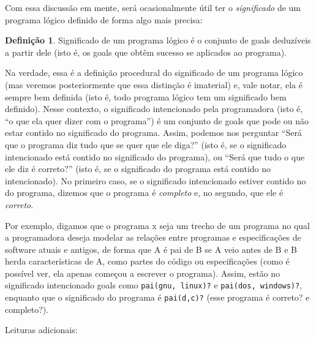 \documentclass{article}
\theoremstyle{definition}
\newtheorem{definition}{Definição}[section]
\theoremstyle{remark}
\begin{document}
Com essa discussão em mente, será ocasionalmente útil ter o \textit{significado} de um programa lógico definido de forma algo mais precisa:

  \theoremstyle{definition}
  \begin{definition}{Significado}
    de um programa lógico é o conjunto de goals deduzíveis a partir dele (isto é, os goals que obtêm sucesso se aplicados ao programa).
  \end{definition}

  Na verdade, essa é a definição procedural do significado de um programa lógico (mas veremos posteriormente que essa distinção é imaterial) e, vale notar, ela é sempre bem definida (isto é, todo programa lógico tem um significado bem definido). Nesse contexto, o significado intencionado pela programadora (isto é, ``o que ela quer dizer com o programa'') é um conjunto de goals que pode ou não estar contido no significado do programa. Assim, podemos nos perguntar ``Será que o
  programa diz tudo que se quer que ele diga?'' (isto é, se o significado intencionado está contido no significado do programa), ou ``Será que tudo o que ele diz é correto?'' (isto é, se o significado do programa está contido no intencionado). No primeiro caso, se o significado intencionado estiver contido no do programa, dizemos que o programa é \textit{completo} e, no segundo, que ele é \textit{correto}.

  Por exemplo, digamos que o programa x seja um trecho de um programa no qual a programadora deseja modelar as relações entre programas e especificações de software atuais e antigos, de forma que A é pai de B se A veio antes de B e B herda características de A, como partes do código ou especificações (como é possível ver, ela apenas começou a escrever o programa). Assim, estão no significado intencionado goals como {\tt pai(gnu, linux)?} e {\tt pai(dos, windows)?}, enquanto que o
  significado do programa é {\tt pai(d,c)?} (esse programa é correto? e completo?).


  Leituras adicionais:
\end{document}
